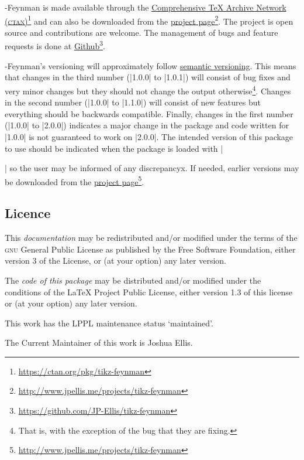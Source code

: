 \documentclass[a4paper,final]{ltxdoc}
\providecommand{\tikzfeynmanname}{\tikzname-Feynman}
\begin{document}
\tikzfeynmanname{} is made available through the
\href{https://ctan.org/pkg/tikz-feynman}{Comprehensive \TeX{} Archive Network
  (\textsc{ctan})}\footnote{\url{https://ctan.org/pkg/tikz-feynman}} and can
also be downloaded from the
\href{http://www.jpellis.me/projects/tikz-feynman}{project
  page}\footnote{\url{http://www.jpellis.me/projects/tikz-feynman}}.  The
project is open source and contributions are welcome.  The management of bugs
and feature requests is done at
\href{https://github.com/JP-Ellis/tikz-feynman}{Github}\footnote{\url{https://github.com/JP-Ellis/tikz-feynman}}.

\tikzfeynmanname{}'s versioning will approximately follow
\href{http://semverg.org}{semantic versioning}.  This means that changes in the
third number (|1.0.0| to |1.0.1|) will consist of bug fixes and very minor
changes but they should not change the output otherwise\footnote{That is, with
  the exception of the bug that they are fixing.}.  Changes in the second number
(|1.0.0| to |1.1.0|) will consist of new features but everything should be
backwards compatible.  Finally, changes in the first number (|1.0.0| to |2.0.0|)
indicates a major change in the package and code written for |1.0.0| is not
guaranteed to work on |2.0.0|.  The intended version of this package to use
should be indicated when the package is loaded with
|\usepackage[compat=x.y.z]{tikz-feynman}| so the user may be informed of any
discrepancyx.  If needed, earlier versions may be downloaded from the
\href{http://www.jpellis.me/projects/tikz-feynman}{project
  page}\footnote{\url{http://www.jpellis.me/projects/tikz-feynman}}.

\subsection*{Licence}
\label{subsec:licence}

This \emph{documentation} may be redistributed and/or modified under the terms
of the \textsc{gnu} General Public License as published by the Free Software
Foundation, either version 3 of the License, or (at your option) any later
version.

The \emph{code of this package} may be distributed and/or modified under the
conditions of the \LaTeX{} Project Public License, either version 1.3 of this
license or (at your option) any later version.

This work has the LPPL maintenance status `maintained'.

The Current Maintainer of this work is Joshua Ellis.
\end{document}

